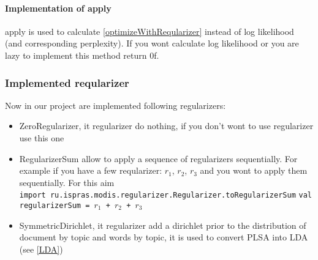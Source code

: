     \paragraph{Implementation of apply \\}
	apply is used to calculate \ref{optimizeWithReqularizer} instead of log likelihood (and corresponding perplexity). If you wont calculate log likelihood or
	you are lazy to implement this method return 0f. 

    \subsubsection{Implemented reqularizer}
	Now in our project are implemented following regularizers:
	\begin{itemize}
	    \item ZeroRegularizer, it regularizer do nothing, if you don't wont to use regularizer use this one
	    \item RegularizerSum allow to apply a sequence of regularizers sequentially. For example if you have a few reqularizer: $r_1$, $r_2$, $r_3$ and you wont to
		apply them sequentially. For this aim\\
		\texttt{import ru.ispras.modis.regularizer.Regularizer.toRegularizerSum}
		\texttt{val regularizerSum = $r_1$ + $r_2$ + $r_3$}
	    \item SymmetricDirichlet, it regularizer add a dirichlet prior to the distribution of document by topic and words by topic, it is used to convert PLSA into LDA (see \ref{LDA})
 	\end{itemize}

	